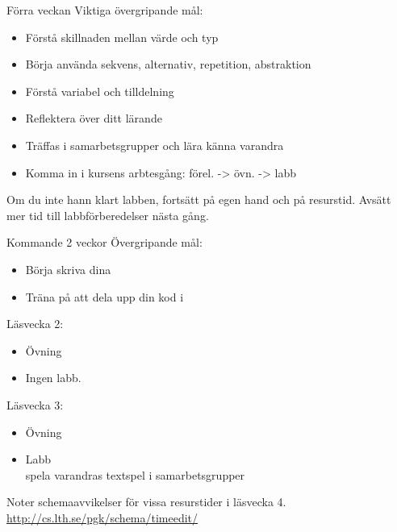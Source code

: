 

\begin{SlideExtra}{Förra veckan}
Viktiga övergripande mål:
\begin{itemize}
\item Förstå skillnaden mellan värde och typ
\item Börja använda sekvens, alternativ, repetition, abstraktion
\item Förstå variabel och tilldelning
\item Reflektera över ditt lärande
\item Träffas i samarbetsgrupper och lära känna varandra
\item Komma in i kursens arbtesgång: förel. -> övn. -> labb
\end{itemize}
Om du inte hann klart labben, fortsätt på egen hand och på resurstid. Avsätt mer tid till labbförberedelser nästa gång.
\end{SlideExtra}


\begin{SlideExtra}{Kommande 2 veckor}
Övergripande mål:
\begin{itemize}
\item Börja skriva dina 
\item Träna på att dela upp din kod i 
\end{itemize}

Läsvecka 2:
\begin{itemize}
\item Övning \texttt{\ExeWeekTWO}
\item Ingen labb.
\end{itemize}
Läsvecka 3:
\begin{itemize}
\item Övning \texttt{\ExeWeekTHREE}
\item Labb \texttt{\LabWeekTHREE}  \\ spela varandras textspel i samarbetsgrupper
\end{itemize}

\vspace{1em} Noter schemaavvikelser för vissa resurstider i läsvecka 4.\\\url{http://cs.lth.se/pgk/schema/timeedit/}

\end{SlideExtra}



